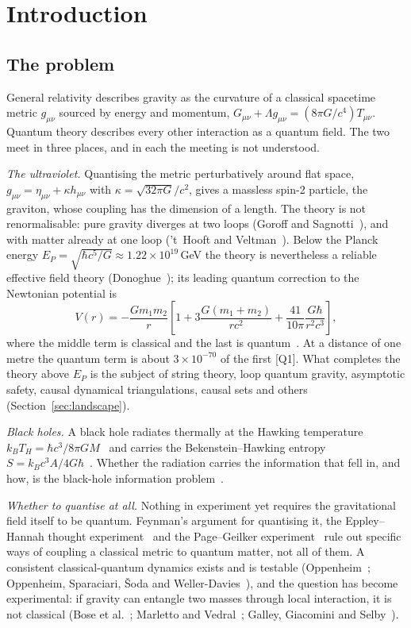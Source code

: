 \documentclass[11pt,a4paper]{article}
\theoremstyle{definition}
\theoremstyle{remark}
\newcommand{\chk}[1]{\textsf{[#1]}}
\theoremstyle{definition}
\begin{document}
\tableofcontents

\section{Introduction}\label{sec:intro}

\subsection{The problem}

General relativity describes gravity as the curvature of a classical spacetime metric $g_{\mu\nu}$ sourced by energy and momentum,
$G_{\mu\nu}+\Lambda g_{\mu\nu}=(8\pi G/c^4)T_{\mu\nu}$. Quantum theory describes every other interaction as a quantum field. The two
meet in three places, and in each the meeting is not understood.

\emph{The ultraviolet.} Quantising the metric perturbatively around flat space, $g_{\mu\nu}=\eta_{\mu\nu}+\kappa h_{\mu\nu}$ with
$\kappa=\sqrt{32\pi G}/c^2$, gives a massless spin-2 particle, the graviton, whose coupling has the dimension of a length. The theory is
not renormalisable: pure gravity diverges at two loops (Goroff and Sagnotti~\cite{goroff}), and with matter already at one loop ('t~Hooft and
Veltman~\cite{thooftveltman}). Below the Planck energy $E_P=\sqrt{\hbar c^5/G}\approx1.22\times10^{19}$\,GeV the theory is nevertheless a
reliable effective field theory (Donoghue~\cite{donoghue}); its leading quantum correction to the Newtonian potential is
\begin{equation}\label{eq:eft}
V(r)=-\frac{Gm_1m_2}{r}\left[1+3\frac{G(m_1+m_2)}{rc^2}+\frac{41}{10\pi}\frac{G\hbar}{r^2c^3}\right],
\end{equation}
where the middle term is classical and the last is quantum~\cite{bdh}. At a distance of one metre the quantum term is about
$3\times10^{-70}$ of the first \chk{Q1}. What completes the theory above $E_P$ is the subject of string theory, loop quantum gravity, asymptotic safety, causal dynamical
triangulations, causal sets and others (Section~\ref{sec:landscape}).

\emph{Black holes.} A black hole radiates thermally at the Hawking temperature $k_BT_H=\hbar c^3/8\pi GM$~\cite{hawking75} and carries the
Bekenstein--Hawking entropy $S=k_Bc^3A/4G\hbar$~\cite{bekenstein73}. Whether the radiation carries the information that fell in, and how,
is the black-hole information problem~\cite{page93,penington,aemm}.

\emph{Whether to quantise at all.} Nothing in experiment yet requires the gravitational field itself to be quantum. Feynman's argument for
quantising it, the Eppley--Hannah thought experiment~\cite{eppley} and the Page--Geilker experiment~\cite{pagegeilker} rule out specific
ways of coupling a classical metric to quantum matter, not all of them. A consistent classical-quantum dynamics exists and is testable
(Oppenheim~\cite{oppenheim}; Oppenheim, Sparaciari, \v{S}oda and Weller-Davies~\cite{osswd}), and the question has become experimental:
if gravity can entangle two masses through local interaction, it is not classical (Bose et al.~\cite{bose}; Marletto and Vedral~\cite{mv};
Galley, Giacomini and Selby~\cite{ggs}).
\end{document}
